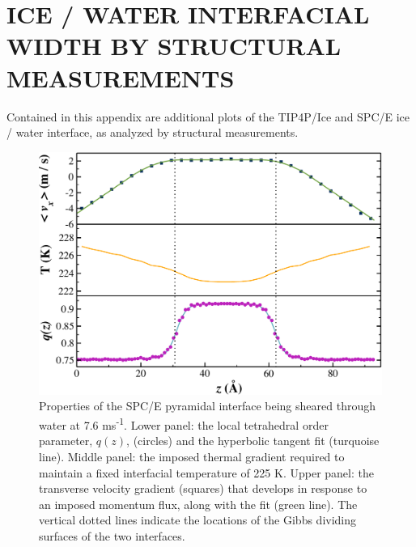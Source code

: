 \chapter{ICE / WATER INTERFACIAL WIDTH BY STRUCTURAL MEASUREMENTS}

Contained in this appendix are additional plots of the TIP4P/Ice and SPC/E ice / water interface, as analyzed by structural measurements.

\begin{figure}
\includegraphics[width=\linewidth]{Figures/Pyr_comic_strip}
\caption{\label{fig:pyrComic} Properties of the SPC/E pyramidal
  interface being sheared through water at 7.6
  ms\textsuperscript{-1}. Lower panel: the local tetrahedral order
  parameter, $q(z)$, (circles) and the hyperbolic tangent fit
  (turquoise line).  Middle panel: the imposed thermal gradient
  required to maintain a fixed interfacial temperature of 225 K. Upper
  panel: the transverse velocity gradient (squares) that develops in
  response to an imposed momentum flux, along with the fit (green
  line). The vertical dotted lines indicate the locations of the Gibbs
  dividing surfaces of the two interfaces.}
\end{figure}

